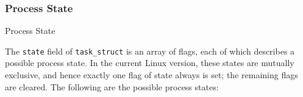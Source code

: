 \subsubsection{Process State}

\begin{frame}{Process State}
  \begin{center}
  \end{center}
\end{frame}

 The
\texttt{state} field of \texttt{task\_struct} is an array of flags, each of which describes a
possible process state. In the current Linux version, these states are mutually exclusive,
and hence exactly one flag of state always is set; the remaining flags are cleared. The
following are the possible process states:
